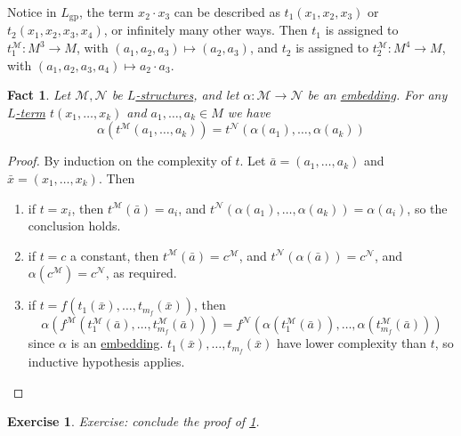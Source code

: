 \documentclass{article}
\newtheorem{nexercise}[nthm]{Exercise}
\newtheorem{nfact}[nthm]{Fact}
\newcommand{\named}[1]{\textbf{#1}\index{#1}}
\begin{document}
Notice in $L_{\text{gp}}$, the term $x_2 \cdot x_3$ can be described as $t_1(x_1, x_2, x_3)$ or $t_2(x_1, x_2, x_3, x_4)$, or infinitely many other ways.
Then $t_1$ is assigned to $t_1^\mathcal{M}: M^3 \to M$, with $(a_1, a_2, a_3) \mapsto (a_2, a_3)$, and $t_2$ is assigned to $t_2^\mathcal{M} : M^4 \to M$, with $(a_1, a_2, a_3, a_4) \mapsto a_2 \cdot a_3$.
\begin{nfact}\label{fact:2.3}
  Let $\mathcal{M}, \mathcal{N}$ be \hyperlink{def:lstr}{$L$-structures}, and let $\alpha: \mathcal{M} \to \mathcal{N}$ be an \hyperlink{def:embedding}{embedding}.
  For any \hyperlink{def:lterm}{$L$-term} $t(x_1, \dotsc, x_k)$ and $a_1, \dotsc, a_k \in M$ we have
  \begin{equation*}
    \alpha(t^\mathcal{M}(a_1, \dotsc, a_k)) = t^\mathcal{N}(\alpha(a_1), \dotsc, \alpha(a_k))
  \end{equation*}
\end{nfact}
\begin{proof}
  By induction on the complexity of $t$. Let $\bar{a} = (a_1, \dotsc, a_k)$ and $\bar{x} = (x_1, \dotsc, x_k)$.
  Then
  \begin{enumerate}[label=(\roman*)]
    \item if $t = x_i$, then $t^\mathcal{M}(\bar{a}) = a_i$, and $t^\mathcal{N}(\alpha(a_1), \dotsc, \alpha(a_k)) = \alpha(a_i)$, so the conclusion holds.
    \item if $t = c$ a constant, then $t^\mathcal{M}(\bar{a}) = c^\mathcal{M}$, and $t^\mathcal{N}(\alpha(\bar{a})) = c^\mathcal{N}$, and $\alpha(c^\mathcal{M}) = c^\mathcal{N}$, as required.
    \item if $t = f(t_1(\bar{x}),\dotsc, t_{m_f}(\bar{x}))$, then
      \begin{equation*}
        \alpha(f^\mathcal{M}(t_1^\mathcal{M}(\bar{a}), \dotsc, t_{m_f}^\mathcal{M}(\bar{a}))) = f^\mathcal{N}(\alpha(t_1^\mathcal{M}(\bar{a})), \dotsc, \alpha(t_{m_f}^\mathcal{M}(\bar{a})))
      \end{equation*}
      since $\alpha$ is an \hyperlink{def:embedding}{embedding}.
      $t_1(\bar{x}), \dotsc, t_{m_f}(\bar{x})$ have lower complexity than $t$, so inductive hypothesis applies. \qedhere
  \end{enumerate}
\end{proof}
\begin{nexercise}\label{ex:2.4}
  Exercise: conclude the proof of \cref{fact:2.3}.
\end{nexercise}
\end{document}
